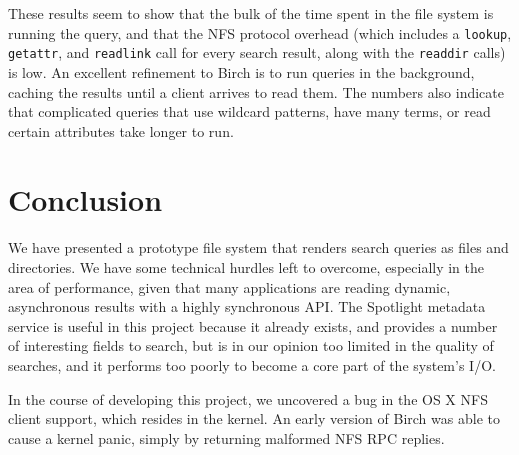 \documentclass{article}
\begin{document}
These results seem to show that the bulk of the time spent in the file
system is running the query, and that the NFS protocol overhead (which
includes a \texttt{lookup}, \texttt{getattr}, and \texttt{readlink}
call for every search result, along with the \texttt{readdir} calls)
is low. An excellent refinement to Birch is to run queries in the
background, caching the results until a client arrives to read
them. The numbers also indicate that complicated queries that use
wildcard patterns, have many terms, or read certain attributes take
longer to run.

\section{Conclusion}

We have presented a prototype file system that renders search queries
as files and directories. We have some technical hurdles left to
overcome, especially in the area of performance, given that many
applications are reading dynamic, asynchronous results with a highly
synchronous API. The Spotlight metadata service is useful in this
project because it already exists, and provides a number of
interesting fields to search, but is in our opinion too limited in the
quality of searches, and it performs too poorly to become a core part
of the system's I/O.

In the course of developing this project, we uncovered a bug in the OS
X NFS client support, which resides in the kernel. An early version of
Birch was able to cause a kernel panic, simply by returning malformed
NFS RPC replies.



\vfill
\begin{center}
\end{center}
\vfill
\end{document}
